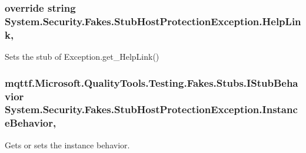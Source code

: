 \hypertarget{class_system_1_1_security_1_1_fakes_1_1_stub_host_protection_exception_a9fa451cf26a24404f0ce5e1eac4b129e}{
\subsubsection[{Help\-Link}]{\setlength{\rightskip}{0pt plus 5cm}override string System.\-Security.\-Fakes.\-Stub\-Host\-Protection\-Exception.\-Help\-Link\hspace{0.3cm}{\ttfamily [get]}, {\ttfamily [set]}}}\label{class_system_1_1_security_1_1_fakes_1_1_stub_host_protection_exception_a9fa451cf26a24404f0ce5e1eac4b129e}


Sets the stub of Exception.\-get\-\_\-\-Help\-Link()

\hypertarget{class_system_1_1_security_1_1_fakes_1_1_stub_host_protection_exception_acf1104686a563f1b08f2a7eb1d2f047b}{
\subsubsection[{Instance\-Behavior}]{\setlength{\rightskip}{0pt plus 5cm}mqttf.\-Microsoft.\-Quality\-Tools.\-Testing.\-Fakes.\-Stubs.\-I\-Stub\-Behavior System.\-Security.\-Fakes.\-Stub\-Host\-Protection\-Exception.\-Instance\-Behavior\hspace{0.3cm}{\ttfamily [get]}, {\ttfamily [set]}}}\label{class_system_1_1_security_1_1_fakes_1_1_stub_host_protection_exception_acf1104686a563f1b08f2a7eb1d2f047b}


Gets or sets the instance behavior.

